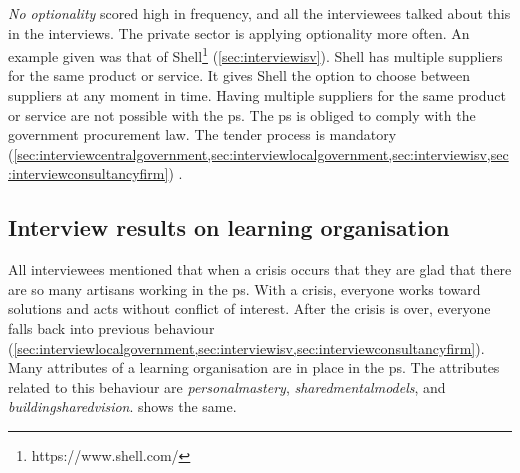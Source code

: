 \textit{No \gls{optionality}} scored high in frequency, and all the interviewees talked about this in the interviews. The private sector is applying optionality more often. An example given was that of Shell\footnote{https://www.shell.com/} (\cref{sec:interviewisv}). Shell has multiple suppliers for the same product or service. It gives Shell the option to choose between suppliers at any moment in time. Having multiple suppliers for the same product or service are not possible with the \gls{ps}. The \gls{ps} is obliged to comply with the government procurement law. The tender process is mandatory (\cref{sec:interviewcentralgovernment,sec:interviewlocalgovernment,sec:interviewisv,sec:interviewconsultancyfirm}) \parencites{Rijksoverheidaanbesteding}{WTO}.
\subsection{Interview results on learning organisation}
\label{sub:interviewresultslearning}
All interviewees mentioned that when a crisis occurs that they are glad that there are so many artisans working in the \gls{ps}. With a crisis, everyone works toward solutions and acts without conflict of interest. After the crisis is over, everyone falls back into previous behaviour (\cref{sec:interviewlocalgovernment,sec:interviewisv,sec:interviewconsultancyfirm}). Many \glspl{attribute} of a learning organisation are in place in the \gls{ps}. The \glspl{attribute} related to this behaviour are \textit{\gls{personalmastery}}, \textit{\glspl{sharedmentalmodel}}, and \textit{\gls{buildingsharedvision}}.  shows the same.

